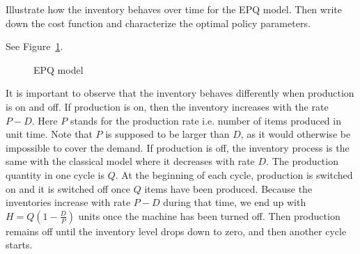 \begin{exercise}
Illustrate how the inventory behaves over time for the EPQ model. Then write down the cost function and characterize the optimal policy parameters.


\begin{solution}

See Figure~\ref{fig:EPQ}.

\begin{figure}[htbp]
\centering
\small
{}
\caption{EPQ model}
\label{fig:EPQ}
\end{figure}

It is important to observe that the inventory behaves differently when production is on and off. If production is on, then the inventory increases with the rate $P-D$. Here $P$ stands for the production rate i.e. number of items produced in unit time. Note that $P$ is supposed to be larger than $D$, as it would otherwise be impossible to cover the demand. If production is off, the inventory process is the same with the classical model where it decreases with rate $D$. The production quantity in one cycle is $Q$. At the beginning of each cycle, production is switched on and it is switched off once $Q$ items have been produced. Because the inventories increase with rate $P-D$ during that time, we end up with $H=Q(1-\frac{D}{P})$ units once the machine has been turned off. Then production remains off until the inventory level drops down to zero, and then another cycle starts.


\end{solution}
\end{exercise}
